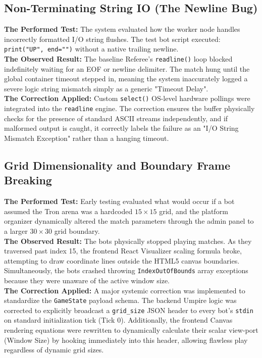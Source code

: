 \documentclass[12pt,a4paper]{report}
\begin{document}
\subsection{Non-Terminating String IO (The Newline Bug)}
\textbf{The Performed Test:} The system evaluated how the worker node handles incorrectly formatted I/O string flushes. The test bot script executed: \texttt{print("UP", end="")} without a native trailing newline. \\
\textbf{The Observed Result:} The baseline Referee's \texttt{readline()} loop blocked indefinitely waiting for an EOF or newline delimiter. The match hung until the global container timeout stepped in, meaning the system inaccurately logged a severe logic string mismatch simply as a generic "Timeout Delay". \\
\textbf{The Correction Applied:} Custom \texttt{select()} OS-level hardware pollings were integrated into the \texttt{readline} engine. The correction ensures the buffer physically checks for the presence of standard ASCII streams independently, and if malformed output is caught, it correctly labels the failure as an "I/O String Mismatch Exception" rather than a hanging timeout.

\subsection{Grid Dimensionality and Boundary Frame Breaking}
\textbf{The Performed Test:} Early testing evaluated what would occur if a bot assumed the Tron arena was a hardcoded $15 \times 15$ grid, and the platform organizer dynamically altered the match parameters through the admin panel to a larger $30 \times 30$ grid boundary. \\
\textbf{The Observed Result:} The bots physically stopped playing matches. As they traversed past index 15, the frontend React Visualizer scaling formula broke, attempting to draw coordinate lines outside the HTML5 canvas boundaries. Simultaneously, the bots crashed throwing \texttt{IndexOutOfBounds} array exceptions because they were unaware of the active window size. \\
\textbf{The Correction Applied:} A major systemic correction was implemented to standardize the \texttt{GameState} payload schema. The backend Umpire logic was corrected to explicitly broadcast a \texttt{grid\_size} JSON header to every bot's \texttt{stdin} on standard initialization tick (Tick 0). Additionally, the frontend Canvas rendering equations were rewritten to dynamically calculate their scalar view-port (Window Size) by hooking immediately into this header, allowing flawless play regardless of dynamic grid sizes.
\end{document}
